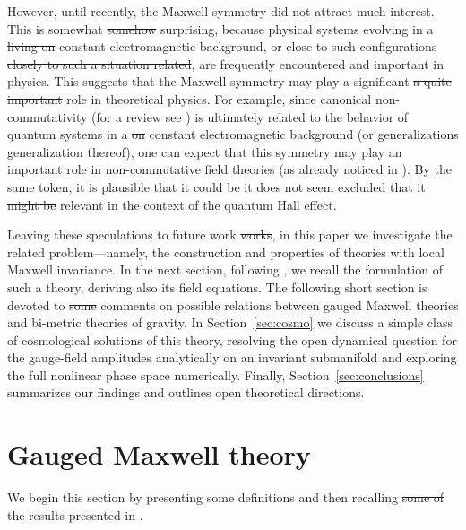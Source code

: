 \documentclass[11pt, a4paper]{article}
\newcommand{\lang}[1]{\textcolor{langfix}{#1}}
\newcommand{\subst}[1]{\textcolor{substantive}{#1}}
\newcommand{\rem}[1]{\textcolor{removeprop}{\sout{#1}}}
\begin{document}
However, until recently, the Maxwell symmetry did not attract much interest. This is \lang{somewhat} \rem{somehow} surprising, because physical systems \lang{evolving in a} \rem{living on} constant electromagnetic background, or \lang{close to such configurations} \rem{closely to such a situation related}, are frequently encountered and important in physics. This suggests that the Maxwell symmetry may play \lang{a significant} \rem{a quite important} role in \lang{theoretical} physics. For example, since canonical non-commutativity (for \lang{a} review see \cite{Douglas:2001ba}) is ultimately related to the behavior of quantum systems \lang{in a} \rem{on} constant electromagnetic background (or \lang{generalizations} \rem{generalization} thereof), one can expect that this symmetry may play an important role in non-commutative field theories (as already noticed in \cite{Doplicher:1994tu}). By the same token, \lang{it is plausible that it could be} \rem{it does not seem excluded that it might be} relevant in the context of \lang{the} quantum Hall effect.

Leaving these speculations to future \lang{work} \rem{works}, in this paper we investigate the related problem\lang{---}namely, the construction and properties of theories with local Maxwell invariance. In the next section, following \cite{Durka:2011nf}, we recall the formulation of such a theory, deriving also its field equations. The following short section is devoted to \rem{some} comments on possible relations between gauged Maxwell theories and bi-metric theories of gravity. In Section~\ref{sec:cosmo} we discuss a simple class of cosmological solutions of this theory\subst{, resolving the open dynamical question for the gauge-field amplitudes analytically on an invariant submanifold and exploring the full nonlinear phase space numerically}. \subst{Finally, Section~\ref{sec:conclusions} summarizes our findings and outlines open theoretical directions.}

\section{Gauged Maxwell theory}

We begin this section \lang{by} presenting some definitions and then recalling \rem{some of} the results presented in \cite{Durka:2011nf}.
\end{document}

